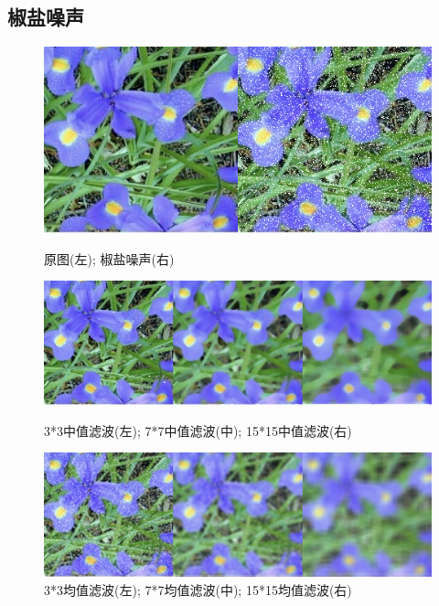 \documentclass[a4paper]{ctexart}
\begin{document}
  \subsection*{椒盐噪声}
  \begin{figure}[H]
    \includegraphics*[width=1.0\textwidth]{fig/salt_noise.png}
    \caption{原图(左); 椒盐噪声(右)}
    \includegraphics*[width=1.0\textwidth]{fig/salt_median.png}
    \caption{3*3中值滤波(左); 7*7中值滤波(中); 15*15中值滤波(右)}
    \includegraphics*[width=1.0\textwidth]{fig/salt_blur.png}
    \caption{3*3均值滤波(左); 7*7均值滤波(中); 15*15均值滤波(右)}
  \end{figure}

  \newpage
\end{document}
